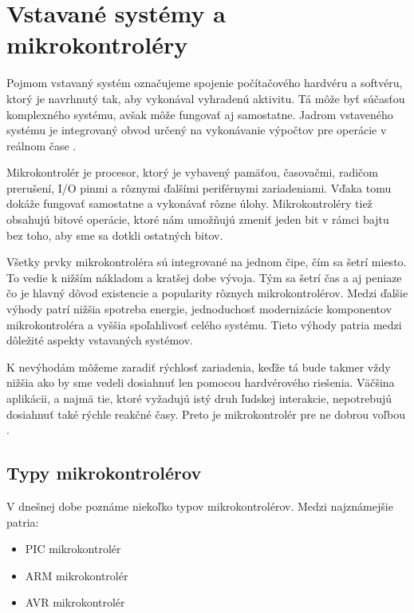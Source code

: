 \section{Vstavané systémy a mikrokontroléry}
\noindent \par
Pojmom vstavaný systém označujeme spojenie počítačového hardvéru a softvéru, ktorý je navrhnutý tak, aby vykonával vyhradenú aktivitu. Tá môže byť súčasťou komplexného systému, avšak môže fungovať aj samostatne. Jadrom vstaveného systému
je integrovaný obvod určený na vykonávanie výpočtov pre operácie v reálnom čase \cite{WhatEmbeddedSystem}. \par
Mikrokontrolér je procesor, ktorý je vybavený pamäťou, časovačmi, radičom prerušení, \acrshort{I/O} pinmi a rôznymi ďalšími periférnymi
zariadeniami. Vďaka tomu dokáže fungovať samostatne a vykonávať rôzne úlohy. Mikrokontroléry tiež obsahujú bitové operácie, ktoré nám umožňujú zmeniť jeden bit v rámci bajtu bez toho, aby sme sa dotkli ostatných bitov. \par
Všetky prvky mikrokontroléra sú integrované na jednom čipe, čím sa šetrí miesto.
To vedie k nižším nákladom a kratšej dobe vývoja. Tým sa šetrí čas a aj peniaze čo je hlavný
dôvod existencie a popularity rôznych mikrokontrolérov. Medzi ďalšie výhody patrí nižšia spotreba energie,
jednoduchosť modernizácie komponentov mikrokontroléra a vyššia spoľahlivosť
celého systému. Tieto výhody patria medzi dôležité aspekty vstavaných systémov. \par
K nevýhodám môžeme zaradiť rýchlosť zariadenia, keďže tá bude takmer vždy
nižšia ako by sme vedeli dosiahnuť len pomocou hardvérového riešenia. Väčšina aplikácii, a najmä tie, ktoré vyžadujú istý druh ľudskej interakcie, nepotrebujú
dosiahnuť také rýchle reakčné časy. Preto je mikrokontrolér pre ne dobrou voľbou
\cite{guntherIntroductionMicrocontrollers2007}.

\subsection{Typy mikrokontrolérov}
\noindent \par
V dnešnej dobe poznáme niekoľko typov mikrokontrolérov. Medzi najznámejšie patria:
\begin{itemize}
    \item \acrshort{PIC} mikrokontrolér
    \item ARM mikrokontrolér
    \item \acrshort{AVR} mikrokontrolér
\end{itemize}

